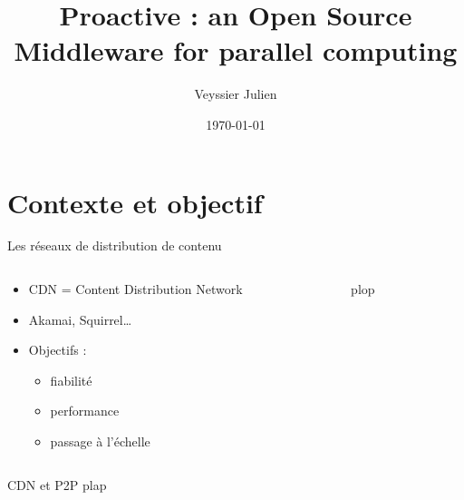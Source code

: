 \documentclass{beamer}
\title{Proactive : an Open Source Middleware for parallel computing}
\author{Veyssier Julien}
\institute{CBGP- INRA}
\date\today
\begin{document}
\begin{frame}
\titlepage
\end{frame}

\begin{frame}
\tableofcontents
\end{frame}

\section{Contexte et objectif}

\begin{frame}
	\tableofcontents[currentsection]
\end{frame}

\begin{frame}{Les réseaux de distribution de contenu}
	\begin{columns}
	\begin{column}[l]{0.5\linewidth}
	\begin{block}{}
			\begin{itemize}
				\item CDN = Content Distribution Network
				\item Akamai, Squirrel\ldots %
				\item Objectifs :
					\begin{itemize}
						\item fiabilité
						\item performance
						\item passage à l'échelle
					\end{itemize}
			\end{itemize}
					
		\end{block}
	\end{column}
	\begin{column}[r]{0.5\linewidth}
        plop
	\end{column}
	\end{columns}
\end{frame}

\begin{frame}{CDN et P2P}
    plap
\end{frame}
\end{document}
